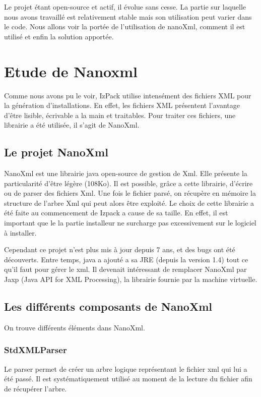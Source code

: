 Le projet étant open-source et actif, il évolue sans cesse. La partie sur laquelle nous avons travaillé est relativement stable mais son utilisation peut varier dans le code. Nous allons voir la portée de l'utilisation de nanoXml, comment il est utilisé et enfin la solution apportée.

\section{Etude de Nanoxml}
Comme nous avons pu le voir, IzPack utilise intensément des fichiers XML pour la génération d'installations.
En effet, les fichiers XML présentent l'avantage d'être lisible, écrivable a la main et traitables.
Pour traiter ces fichiers, une librairie a été utilisée, il s'agit de NanoXml.
\subsection{Le projet NanoXml}
NanoXml est une librairie java open-source de gestion de Xml.
Elle présente la particularité d'être légère (108Ko). 
Il est possible, grâce a cette librairie, d'écrire ou de parser des fichiers Xml.
Une fois le fichier parsé, on récupère en mémoire la structure de l'arbre Xml qui peut alors être exploité.
Le choix de cette librairie a été faite au commencement de Izpack a cause de sa taille.
En effet, il est important que le la partie installeur ne surcharge pas excessivement sur le logiciel à installer.

Cependant ce projet n'est plus mis à jour depuis 7 ans, et des bugs ont été découverts.
Entre temps, java a ajouté a sa JRE (depuis la version 1.4) tout ce qu'il faut pour gérer le xml.
Il devenait intéressant de remplacer NanoXml par Jaxp (Java API for XML Processing), la librairie fournie par la machine virtuelle.
\subsection{Les différents composants de NanoXml}
On trouve différents éléments dans NanoXml.
\subsubsection{StdXMLParser}
Le parser permet de créer un arbre logique représentant le fichier xml qui lui a été passé.
Il est systématiquement utilisé au moment de la lecture du fichier afin de récupérer l'arbre.
